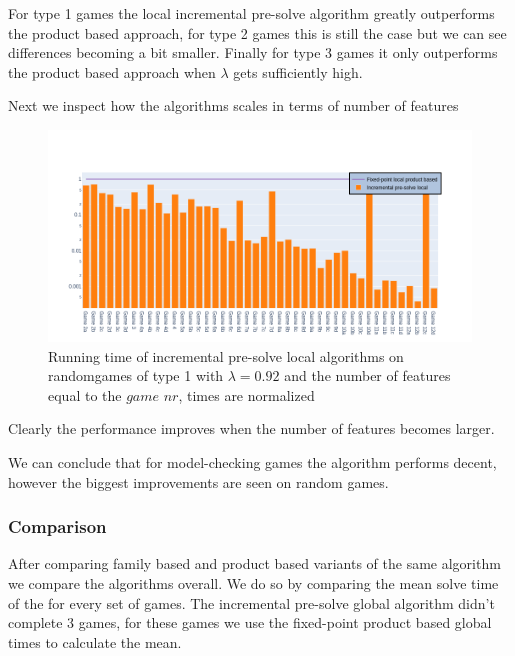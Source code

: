 For type 1 games the local incremental pre-solve algorithm greatly outperforms the product based approach, for type 2 games this is still the case but we can see differences becoming a bit smaller. Finally for type 3 games it only outperforms the product based approach when $\lambda$ gets sufficiently high.

Next we inspect how the algorithms scales in terms of number of features
\begin{figure}[H]
	\includegraphics[width=1\linewidth]{"results/randomscalegames/Fixed-point local product based_Incremental pre-solve local_"}
	\caption{Running time of incremental pre-solve local algorithms on randomgames of type 1 with $\lambda = 0.92$ and the number of features equal to the $\textit{game nr}$, times are normalized}
	\label{fig:elevatorzlnks}
\end{figure}%
Clearly the performance improves when the number of features becomes larger.

We can conclude that for model-checking games the algorithm performs decent, however the biggest improvements are seen on random games.
\subsubsection{Comparison}
After comparing family based and product based variants of the same algorithm we compare the algorithms overall. We do so by comparing the mean solve time of the for every set of games. The incremental pre-solve global algorithm didn't complete 3 games, for these games we use the fixed-point product based global times to calculate the mean.

